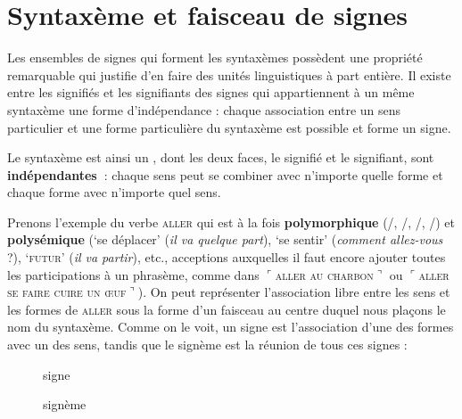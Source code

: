 \section{Syntaxème et faisceau de signes}\label{sec:2.3.17}

Les ensembles de signes qui forment les syntaxèmes possèdent une propriété remarquable qui justifie d’en faire des unités linguistiques à part entière. Il existe entre les signifiés et les signifiants des signes qui appartiennent à un même syntaxème une forme d’indépendance : chaque association entre un sens particulier et une forme particulière du syntaxème est possible et forme un signe.

\begin{styleLivreImportant}
Le syntaxème est ainsi un , dont les deux faces, le signifié et le signifiant, sont \textbf{indépendantes~}: chaque sens peut se combiner avec n’importe quelle forme et chaque forme avec n’importe quel sens.
\end{styleLivreImportant}

Prenons l’exemple du verbe \textsc{aller} qui est à la fois \textbf{polymorphique} (/, /, /, /) et \textbf{polysémique} (‘se déplacer’ (\textit{il va quelque part}), ‘se sentir’ (\textit{comment allez-vous} ?), ‘\textsc{futur}’ (\textit{il va partir}), etc., acceptions auxquelles il faut encore ajouter toutes les participations à un phrasème, comme dans $⌜$\textsc{aller} \textsc{au} \textsc{charbon}$⌝$ ou $⌜$\textsc{aller} \textsc{se} \textsc{faire} \textsc{cuire} \textsc{un} \textsc{œuf}$⌝$). On peut représenter l’association libre entre les sens et les formes de \textsc{aller} sous la forme d’un faisceau au centre duquel nous plaçons le nom du syntaxème. Comme on le voit, un signe est l’association d’une des formes avec un des sens, tandis que le signème est la réunion de tous ces signes :

\begin{figure}
\caption{signe\label{fig:}}
\end{figure}

\begin{figure}
\caption{signème}
\end{figure}


